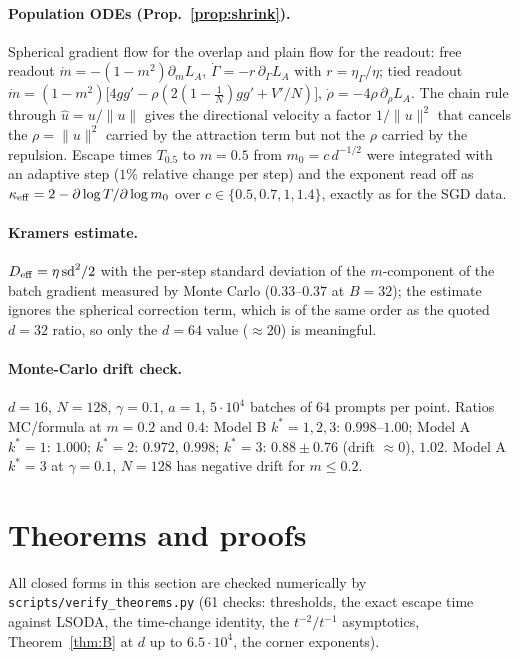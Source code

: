 \paragraph{Population ODEs (Prop.~\ref{prop:shrink}).} Spherical gradient flow for the overlap and plain flow for the readout:
free readout $\dot m=-(1-m^2)\partial_mL_A$, $\dot\Gamma=-r\,\partial_\Gamma L_A$ with $r=\eta_\Gamma/\eta$; tied readout
$\dot m=(1-m^2)\big[4gg'-\rho(2(1-\tfrac1N)gg'+V'/N)\big]$, $\dot\rho=-4\rho\,\partial_\rho L_A$. The chain rule through $\hat u=u/\|u\|$
gives the directional velocity a factor $1/\|u\|^2$ that cancels the $\rho=\|u\|^2$ carried by the attraction term but not the $\rho$ carried by the repulsion.
Escape times $T_{0.5}$ to $m=0.5$ from $m_0=c\,d^{-1/2}$ were integrated with an adaptive step ($1\%$ relative change per step) and
the exponent read off as $\kappa_{\rm eff}=2-\partial\log T/\partial\log m_0$ over $c\in\{0.5,0.7,1,1.4\}$, exactly as for the SGD data.

\paragraph{Kramers estimate.} $D_{\rm eff}=\eta\,\mathrm{sd}^2/2$ with the per-step standard deviation of the $m$-component of the batch gradient measured
by Monte Carlo ($0.33$--$0.37$ at $B=32$); the estimate ignores the spherical correction term, which is of the same order as the
quoted $d=32$ ratio, so only the $d=64$ value ($\approx20$) is meaningful.

\paragraph{Monte-Carlo drift check.} $d=16$, $N=128$, $\gamma=0.1$, $a=1$, $5\cdot10^4$ batches of $64$ prompts per point.
Ratios MC/formula at $m=0.2$ and $0.4$: Model B $k^*=1,2,3$: $0.998$--$1.00$; Model A $k^*=1$: $1.000$; $k^*=2$: $0.972$, $0.998$;
$k^*=3$: $0.88\pm0.76$ (drift $\approx0$), $1.02$. Model A $k^*=3$ at $\gamma=0.1$, $N=128$ has negative drift for $m\le0.2$.

\section{Theorems and proofs}
\label{app:thm}
All closed forms in this section are checked numerically by \texttt{scripts/verify\_theorems.py} (61 checks: thresholds, the exact escape time
against LSODA, the time-change identity, the $t^{-2}/t^{-1}$ asymptotics, Theorem~\ref{thm:B} at $d$ up to $6.5\cdot10^4$, the corner exponents).


